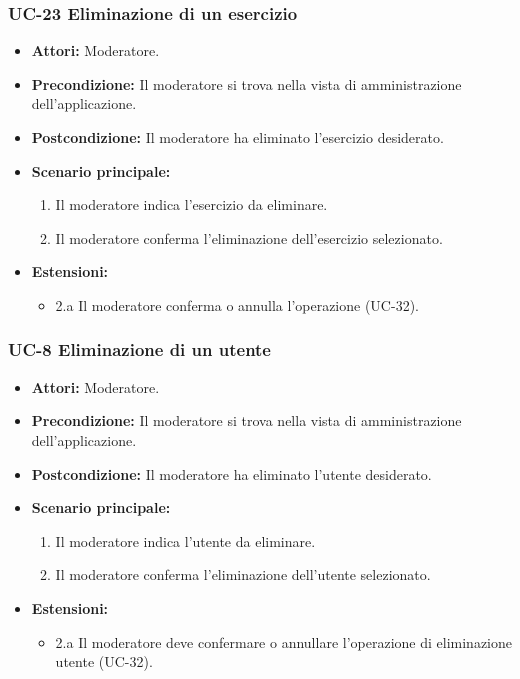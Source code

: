 \subsubsection{UC-23 Eliminazione di un esercizio}
			\begin{itemize}
			\item \textbf{Attori:} Moderatore.
			\item \textbf{Precondizione:} Il moderatore si trova nella vista di amministrazione dell'applicazione.
			\item \textbf{Postcondizione:} Il moderatore ha eliminato l'esercizio desiderato.
			\item \textbf{Scenario principale:}
				\begin{enumerate}
					\item Il moderatore indica l'esercizio da eliminare.
					\item Il moderatore conferma l'eliminazione dell'esercizio selezionato.
				\end{enumerate}
			\item \textbf{Estensioni:}
			\begin{itemize}
			\item 2.a Il moderatore conferma o annulla l'operazione (UC-32).
			\end{itemize}
		\end{itemize}


\subsubsection{UC-8 Eliminazione di un utente}
\begin{itemize}
	\item \textbf{Attori:} Moderatore.
	\item \textbf{Precondizione:} Il moderatore si trova nella vista di amministrazione dell'applicazione.
	\item \textbf{Postcondizione:} Il moderatore ha eliminato l'utente desiderato.
	\item \textbf{Scenario principale:}
	\begin{enumerate}
		\item Il moderatore indica l'utente da eliminare.
		\item Il moderatore conferma l'eliminazione dell'utente selezionato.
	\end{enumerate}
\item \textbf{Estensioni:}
\begin{itemize}
	\item 2.a Il moderatore deve confermare o annullare l'operazione di eliminazione utente (UC-32).
\end{itemize}
\end{itemize}


